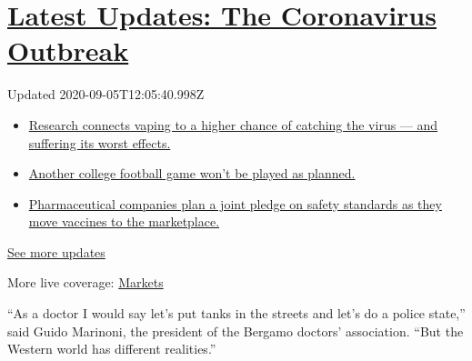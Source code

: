 \hypertarget{latest-updates-the-coronavirus-outbreak}{%
\section{\texorpdfstring{\href{https://www.nytimes3xbfgragh.onion/2020/09/04/world/covid-19-coronavirus.html?action=click\&pgtype=Article\&state=default\&region=MAIN_CONTENT_1\&context=storylines_live_updates}{Latest
Updates: The Coronavirus
Outbreak}}{Latest Updates: The Coronavirus Outbreak}}\label{latest-updates-the-coronavirus-outbreak}}

Updated 2020-09-05T12:05:40.998Z

\begin{itemize}
\tightlist
\item
  \href{https://www.nytimes3xbfgragh.onion/2020/09/04/world/covid-19-coronavirus.html?action=click\&pgtype=Article\&state=default\&region=MAIN_CONTENT_1\&context=storylines_live_updates\#link-1654f6ad}{Research
  connects vaping to a higher chance of catching the virus --- and
  suffering its worst effects.}
\item
  \href{https://www.nytimes3xbfgragh.onion/2020/09/04/world/covid-19-coronavirus.html?action=click\&pgtype=Article\&state=default\&region=MAIN_CONTENT_1\&context=storylines_live_updates\#link-52e4198a}{Another
  college football game won't be played as planned.}
\item
  \href{https://www.nytimes3xbfgragh.onion/2020/09/04/world/covid-19-coronavirus.html?action=click\&pgtype=Article\&state=default\&region=MAIN_CONTENT_1\&context=storylines_live_updates\#link-181cef0}{Pharmaceutical
  companies plan a joint pledge on safety standards as they move
  vaccines to the marketplace.}
\end{itemize}

\href{https://www.nytimes3xbfgragh.onion/2020/09/04/world/covid-19-coronavirus.html?action=click\&pgtype=Article\&state=default\&region=MAIN_CONTENT_1\&context=storylines_live_updates}{See
more updates}

More live coverage:
\href{https://www.nytimes3xbfgragh.onion/live/2020/09/04/business/stock-market-today-coronavirus?action=click\&pgtype=Article\&state=default\&region=MAIN_CONTENT_1\&context=storylines_live_updates}{Markets}

``As a doctor I would say let's put tanks in the streets and let's do a
police state,'' said Guido Marinoni, the president of the Bergamo
doctors' association. ``But the Western world has different realities.''

